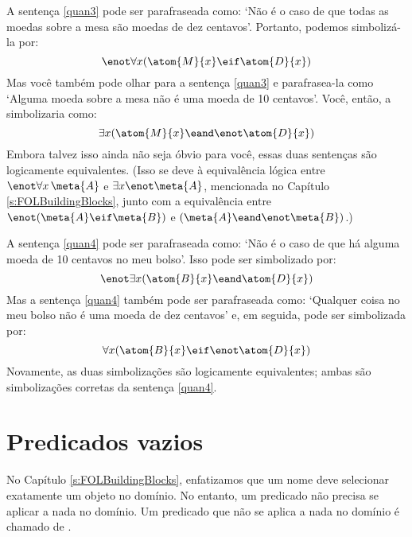 A sentença \ref{quan3} pode ser parafraseada como:
`Não é o caso de que todas as moedas sobre a mesa são moedas de dez centavos'.
Portanto, podemos simbolizá-la por:
$$\enot \forall x(\atom{M}{x} \eif \atom{D}{x})$$
Mas você também pode olhar para a sentença \ref{quan3} e parafrasea-la como `Alguma moeda sobre a mesa não é uma moeda de 10 centavos'.
Você, então, a simbolizaria como:
$$\exists x(\atom{M}{x} \eand \enot \atom{D}{x})$$
Embora talvez isso ainda não seja óbvio para você, essas duas sentenças são logicamente equivalentes.
(Isso se deve à equivalência lógica entre $\enot\forall x\,\meta{A}$ e $\exists x\enot\meta{A}$, mencionada no Capítulo \ref{s:FOLBuildingBlocks}, junto com a equivalência entre $\enot(\meta{A}\eif\meta{B})$ e $(\meta{A}\eand\enot\meta{B})$.)

A sentença \ref{quan4} pode ser parafraseada como:
`Não é o caso de que há alguma moeda de 10 centavos no meu bolso'.
Isso pode ser simbolizado por:
$$\enot\exists x(\atom{B}{x} \eand \atom{D}{x})$$
Mas a sentença \ref{quan4} também pode ser parafraseada  como:
`Qualquer coisa no meu bolso não é uma moeda de dez centavos' e, em seguida, pode ser simbolizada por:
$$\forall x(\atom{B}{x} \eif \enot \atom{D}{x})$$
Novamente, as duas simbolizações são logicamente equivalentes; ambas são simbolizações corretas da sentença \ref{quan4}.


\section{Predicados vazios}\label{s:PredVaz}

No Capítulo \ref{s:FOLBuildingBlocks}, enfatizamos que um nome deve selecionar exatamente um objeto no domínio.
No entanto, um predicado não precisa se aplicar a nada no domínio.
Um predicado que não se aplica a nada no domínio é chamado de .

